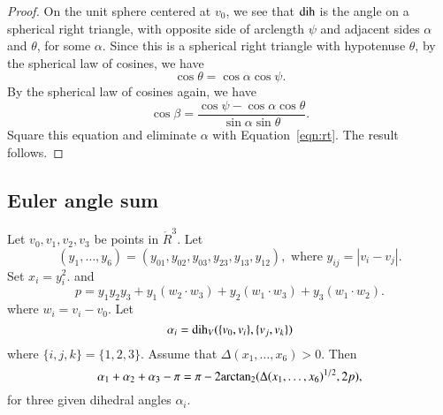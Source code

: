 \begin{proof}  On the unit sphere centered at $v_0$, we see that
$\operatorname{dih}$ is the angle on a spherical right triangle,
with opposite side of arclength $\psi$ and adjacent sides $\alpha$
and $\theta$, for some $\alpha$. 
 Since this is a spherical right triangle with hypotenuse
$\theta$, by the spherical law of cosines, we have
   \begin{equation}\label{eqn:rt}
     \cos\theta = \cos\alpha \cos\psi.
     \end{equation}
By the spherical law of cosines again, we have
    $$
    \cos\beta = \frac{\cos\psi - \cos\alpha\cos\theta}{\sin\alpha\sin\theta}.
    $$
Square this equation and eliminate $\alpha$ with Equation~\ref{eqn:rt}.
The result follows.
\end{proof}




\subsection{Euler angle sum}
\begin{lemma}\label{lemma:euler}
Let $v_0,v_1,v_2,v_3$ be points in $\ring{R}^3$. 
Let 
  $$(y_1,\ldots,y_6) =(y_{01},y_{02},y_{03},y_{23},y_{13},y_{12}),
   \text{ where } y_{ij}=|v_i-v_j|.$$
Set
$x_i = y_i^2$.   
and
    $$
    p = y_1 y_2 y_3 + y_1 (w_2\cdot w_3) + y_2 (w_1\cdot w_3) + y_3
    (w_1\cdot w_2).
    $$
where $w_i = v_i- v_0$.
Let $$\alpha_i =\operatorname{dih}_V(\{v_0,v_i\},\{v_j,v_k\})$$
where $\{i,j,k\}=\{1,2,3\}$.
Assume that $\Delta(x_1,\ldots,x_6)>0$. 
Then
    $$
    \alpha_1+\alpha_2+\alpha_3 - \pi
     = {\pi} - 2{\operatorname{arctan_2}}({\Delta(x_1,\ldots,x_6)^{1/2}},{2 p}),
    $$
for three given dihedral angles $\alpha_i$.
\end{lemma}

